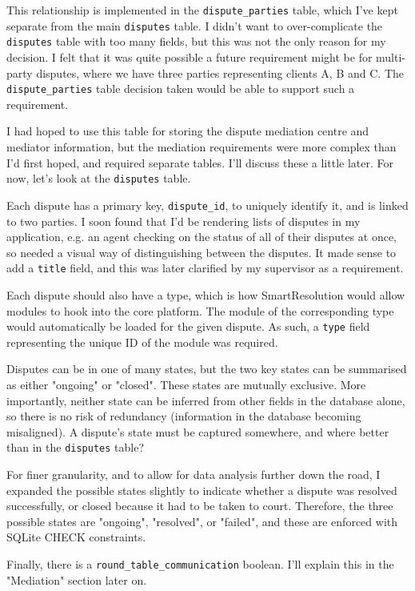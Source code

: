 This relationship is implemented in the \lstinline{dispute_parties} table, which I've kept separate from the main \lstinline{disputes} table. I didn't want to over-complicate the \lstinline{disputes} table with too many fields, but this was not the only reason for my decision. I felt that it was quite possible a future requirement might be for multi-party disputes, where we have three parties representing clients A, B and C. The \lstinline{dispute_parties} table decision taken would be able to support such a requirement.

I had hoped to use this table for storing the dispute mediation centre and mediator information, but the mediation requirements were more complex than I'd first hoped, and required separate tables. I'll discuss these a little later. For now, let's look at the \lstinline{disputes} table.

Each dispute has a primary key, \lstinline{dispute_id}, to uniquely identify it, and is linked to two parties. I soon found that I'd be rendering lists of disputes in my application, e.g. an agent checking on the status of all of their disputes at once, so needed a visual way of distinguishing between the disputes. It made sense to add a \lstinline{title} field, and this was later clarified by my supervisor as a requirement.

Each dispute should also have a type, which is how SmartResolution would allow modules to hook into the core platform. The module of the corresponding type would automatically be loaded for the given dispute. As such, a \lstinline{type} field representing the unique ID of the module was required.

Disputes can be in one of many states, but the two key states can be summarised as either "ongoing" or "closed". These states are mutually exclusive. More importantly, neither state can be inferred from other fields in the database alone, so there is no risk of redundancy (information in the database becoming misaligned). A dispute's state must be captured somewhere, and where better than in the \lstinline{disputes} table?

For finer granularity, and to allow for data analysis further down the road, I expanded the possible states slightly to indicate whether a dispute was resolved successfully, or closed because it had to be taken to court. Therefore, the three possible states are "ongoing", "resolved", or "failed", and these are enforced with SQLite CHECK constraints.

Finally, there is a \lstinline{round_table_communication} boolean. I'll explain this in the "Mediation" section later on.

